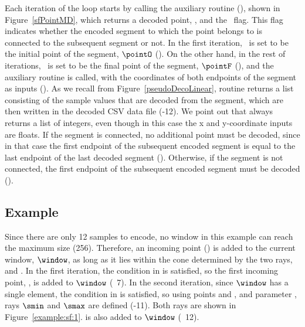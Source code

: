 Each iteration of the loop starts by calling the auxiliary routine \SFDecodePoint (), shown in Figure~\ref{sfPointMD}, which returns a decoded point, \pointP, and the \connected\ flag. This flag indicates whether the encoded segment to which the point belongs to is connected to the subsequent segment or not.  In the first iteration, \pointP\ is set to be the initial point of the segment, $\pointO$ (). On the other hand, in the rest of iterations, \pointP\ is set to be the final point of the segment, $\pointF$ (), and the auxiliary routine \decodeSegment is called, with the coordinates of both endpoints of the segment as inputs (). As we recall from Figure~\ref{pseudoDecoLinear}, routine \decodeSegment returns a list consisting of the sample values that are decoded from the segment, which are then written in the decoded CSV data file (-12). We point out that \decodeSegment always returns a list of integers, even though in this case the x and y-coordinate inputs are floats. If the segment is connected, no additional point must be decoded, since in that case the first endpoint of the subsequent encoded segment is equal to the last endpoint of the last decoded segment (). Otherwise, if the segment is not connected, the first endpoint of the subsequent encoded segment must be decoded ().


\clearpage







        


\clearpage
\subsection{Example}
\label{algo:sf:example}


\vspace{+5pt}
\exampleIntro{\ref{example:sf:1}}


Since there are only 12 samples to encode, no window in this example can reach the maximum size (256). Therefore, an incoming point (\incoming) is added to the current window, $\window$, as long as it lies within the cone determined by the two rays, \smin and \smax. In the first iteration, the condition in  is satisfied, so the first incoming point, , is added to $\window$ (\Line~7). In the second iteration, since $\window$ has a single element, the condition in  is satisfied, so using points \snapshot and , and parameter \maxerror, rays $\smin$ and $\smax$ are defined (-11). Both rays are shown in Figure~\ref{example:sf:1}.  is also added to $\window$ (\Line~12). 


